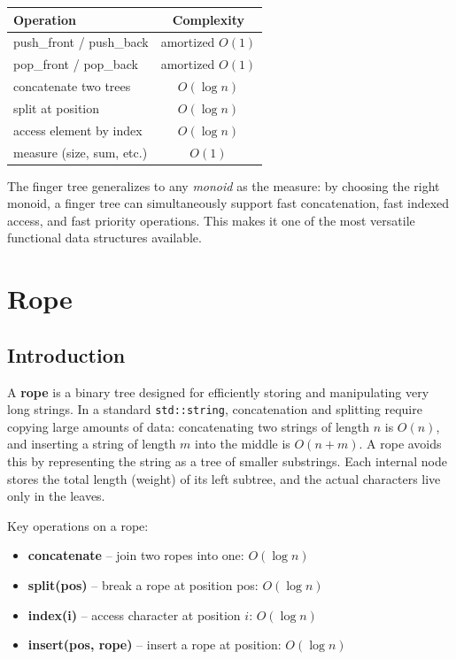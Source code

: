 \begin{center}
\begin{tabular}{lc}
\toprule
\textbf{Operation} & \textbf{Complexity} \\
\midrule
push\_front / push\_back & amortized $O(1)$ \\
pop\_front / pop\_back & amortized $O(1)$ \\
concatenate two trees & $O(\log n)$ \\
split at position & $O(\log n)$ \\
access element by index & $O(\log n)$ \\
measure (size, sum, etc.) & $O(1)$ \\
\bottomrule
\end{tabular}
\end{center}

The finger tree generalizes to any \emph{monoid} as the measure: by choosing the right monoid, a finger tree can simultaneously support fast concatenation, fast indexed access, and fast priority operations. This makes it one of the most versatile functional data structures available.

\section{Rope}

\subsection{Introduction}

A \textbf{rope} is a binary tree designed for efficiently storing and manipulating very long strings. In a standard \texttt{std::string}, concatenation and splitting require copying large amounts of data: concatenating two strings of length $n$ is $O(n)$, and inserting a string of length $m$ into the middle is $O(n + m)$. A rope avoids this by representing the string as a tree of smaller substrings. Each internal node stores the total length (weight) of its left subtree, and the actual characters live only in the leaves.

Key operations on a rope:

\begin{itemize}
\item \textbf{concatenate} -- join two ropes into one: $O(\log n)$
\item \textbf{split(pos)} -- break a rope at position pos: $O(\log n)$
\item \textbf{index(i)} -- access character at position $i$: $O(\log n)$
\item \textbf{insert(pos, rope)} -- insert a rope at position: $O(\log n)$
\end{itemize}

